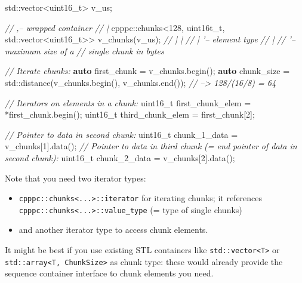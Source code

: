 \documentclass[]{article}
\newenvironment{Shaded}{}{}
\newcommand{\KeywordTok}[1]{\textcolor[rgb]{0.00,0.44,0.13}{\textbf{{#1}}}}
\newcommand{\DataTypeTok}[1]{\textcolor[rgb]{0.56,0.13,0.00}{{#1}}}
\newcommand{\DecValTok}[1]{\textcolor[rgb]{0.25,0.63,0.44}{{#1}}}
\newcommand{\CommentTok}[1]{\textcolor[rgb]{0.38,0.63,0.69}{\textit{{#1}}}}
\newcommand{\NormalTok}[1]{{#1}}
\providecommand{\tightlist}{%
  \setlength{\itemsep}{0pt}\setlength{\parskip}{0pt}}
\begin{document}
\begin{Shaded}
\begin{Highlighting}[]
\NormalTok{std::vector<}\DataTypeTok{uint16_t}\NormalTok{> v_us;}

\CommentTok{//                                    ,-- wrapped container}
\CommentTok{//                                    |}
\NormalTok{cpppc::chunks<}\DecValTok{128}\NormalTok{, uint16t_t, std::vector<}\DataTypeTok{uint16_t}\NormalTok{>> v_chunks(v_us);}
\CommentTok{//             |      |}
\CommentTok{//             |      '-- element type}
\CommentTok{//             |}
\CommentTok{//             '-- maximum size of a}
\CommentTok{//                 single chunk in bytes}

\CommentTok{// Iterate chunks:}
\KeywordTok{auto} \NormalTok{first_chunk = v_chunks.begin();}
\KeywordTok{auto} \NormalTok{chunk_size  = std::distance(v_chunks.begin(), v_chunks.end());}
                   \CommentTok{// --> 128/(16/8) = 64}

\CommentTok{// Iterators on elements in a chunk:}
\DataTypeTok{uint16_t} \NormalTok{first_chunk_elem = *first_chunk.begin();}
\DataTypeTok{uint16_t} \NormalTok{third_chunk_elem = first_chunk[}\DecValTok{2}\NormalTok{];}

\CommentTok{// Pointer to data in second chunk:}
\DataTypeTok{uint16_t} \NormalTok{chunk_1_data = v_chunks[}\DecValTok{1}\NormalTok{].data();}
\CommentTok{// Pointer to data in third chunk (= end pointer of data in second chunk):}
\DataTypeTok{uint16_t} \NormalTok{chunk_2_data = v_chunks[}\DecValTok{2}\NormalTok{].data();}
\end{Highlighting}
\end{Shaded}

Note that you need two iterator types:

\begin{itemize}
\tightlist
\item
  \texttt{cpppc::chunks\textless{}...\textgreater{}::iterator} for
  iterating chunks; it references
  \texttt{cpppc::chunks\textless{}...\textgreater{}::value\_type} (=
  type of single chunks)
\item
  and another iterator type to access chunk elements.
\end{itemize}

It might be best if you use existing STL containers like
\texttt{std::vector\textless{}T\textgreater{}} or
\texttt{std::array\textless{}T,\ ChunkSize\textgreater{}} as chunk type:
these would already provide the sequence container interface to chunk
elements you need.
\end{document}
